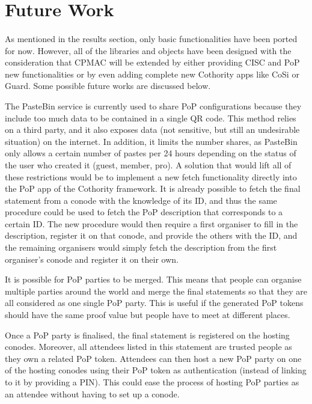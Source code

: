 \section{Future Work}

\paragraph{}
As mentioned in the results section, only basic functionalities have been ported for now. However, all of the libraries and objects have been designed with the consideration that CPMAC will be extended by either providing CISC and PoP new functionalities or by even adding complete new Cothority apps like CoSi or Guard. Some possible future works are discussed below.

\begin{description}[style=nextline]
\item[Replacing PasteBin] The PasteBin service is currently used to share PoP configurations because they include too much data to be contained in a single QR code. This method relies on a third party, and it also exposes data (not sensitive, but still an undesirable situation) on the internet. In addition, it limits the number shares, as PasteBin only allows a certain number of pastes per 24 hours depending on the status of the user who created it (guest, member, pro). A solution that would lift all of these restrictions would be to implement a new fetch functionality directly into the PoP app of the Cothority framework. It is already possible to fetch the final statement from a conode with the knowledge of its ID, and thus the same procedure could be used to fetch the PoP description that corresponds to a certain ID. The new procedure would then require a first organiser to fill in the description, register it on that conode, and provide the others with the ID, and the remaining organisers would simply fetch the description from the first organiser’s conode and register it on their own.

\item[PoP Party Merging] It is possible for PoP parties to be merged. This means that people can organise multiple parties around the world and merge the final statements so that they are all considered as one single PoP party. This is useful if the generated PoP tokens should have the same proof value but people have to meet at different places.

\item[Viral PoP Parties] Once a PoP party is finalised, the final statement is registered on the hosting conodes. Moreover, all attendees listed in this statement are trusted people as they own a related PoP token. Attendees can then host a new PoP party on one of the hosting conodes using their PoP token as authentication (instead of linking to it by providing a PIN). This could ease the process of hosting PoP parties as an attendee without having to set up a conode.


\end{description}
